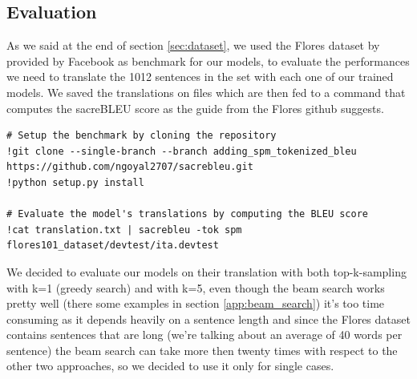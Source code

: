 \subsection{Evaluation}
As we said at the end of section \ref{sec:dataset}, we used the Flores dataset by \cite{goyal2021flores} provided by Facebook as benchmark for our models, to evaluate the performances we need to translate the 1012 sentences in the set with each one of our trained models. We saved the translations on files which are then fed to a command that computes the sacreBLEU score as the guide from the Flores github suggests.
\begin{verbatim}
# Setup the benchmark by cloning the repository
!git clone --single-branch --branch adding_spm_tokenized_bleu https://github.com/ngoyal2707/sacrebleu.git
!python setup.py install

# Evaluate the model's translations by computing the BLEU score
!cat translation.txt | sacrebleu -tok spm flores101_dataset/devtest/ita.devtest
\end{verbatim}
We decided to evaluate our models on their translation with both top-k-sampling with k=1 (greedy search) and with k=5, even though the beam search works pretty well (there some examples in section \ref{app:beam_search}) it's too time consuming as it depends heavily on a sentence length and since the Flores dataset contains sentences that are long (we're talking about an average of 40 words per sentence) the beam search can take more then twenty times with respect to the other two approaches, so we decided to use it only for single cases.
